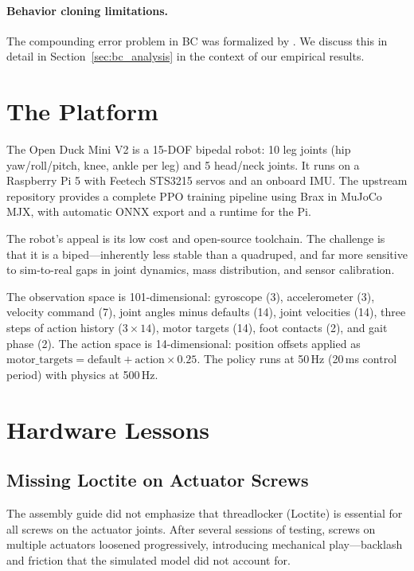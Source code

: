 \documentclass{article}
\begin{document}
\paragraph{Behavior cloning limitations.} The compounding error problem in BC was formalized by \citet{ross2011dagger}. We discuss this in detail in Section~\ref{sec:bc_analysis} in the context of our empirical results.


\section{The Platform}

The Open Duck Mini V2 is a 15-DOF bipedal robot: 10 leg joints (hip yaw/roll/pitch, knee, ankle per leg) and 5 head/neck joints. It runs on a Raspberry Pi 5 with Feetech STS3215 servos and an onboard IMU. The upstream repository provides a complete PPO training pipeline using Brax in MuJoCo MJX, with automatic ONNX export and a runtime for the Pi.

The robot's appeal is its low cost and open-source toolchain. The challenge is that it is a biped---inherently less stable than a quadruped, and far more sensitive to sim-to-real gaps in joint dynamics, mass distribution, and sensor calibration.

The observation space is 101-dimensional: gyroscope (3), accelerometer (3), velocity command (7), joint angles minus defaults (14), joint velocities (14), three steps of action history ($3 \times 14$), motor targets (14), foot contacts (2), and gait phase (2). The action space is 14-dimensional: position offsets applied as $\text{motor\_targets} = \text{default} + \text{action} \times 0.25$. The policy runs at 50\,Hz (20\,ms control period) with physics at 500\,Hz.


\section{Hardware Lessons}

\subsection{Missing Loctite on Actuator Screws}

The assembly guide did not emphasize that threadlocker (Loctite) is essential for all screws on the actuator joints. After several sessions of testing, screws on multiple actuators loosened progressively, introducing mechanical play---backlash and friction that the simulated model did not account for.
\end{document}
